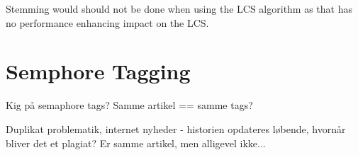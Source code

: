 Stemming would should not be done when using the LCS algorithm as that has no performance enhancing impact on the LCS.

\section{Semphore Tagging}

Kig på semaphore tags? Samme artikel == samme tags?

Duplikat problematik, internet nyheder - historien opdateres løbende, hvornår bliver det et plagiat? Er samme artikel, men alligevel ikke...



